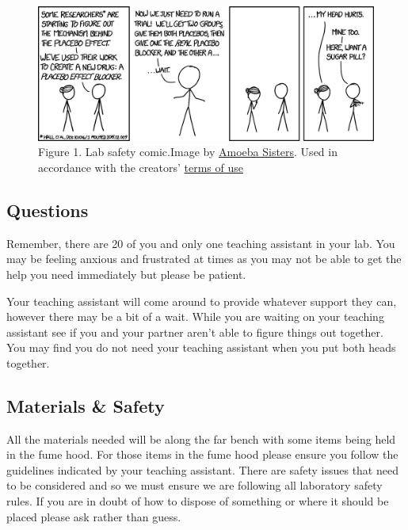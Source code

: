 \documentclass[
]{book}
\begin{document}
\begin{figure}
\centering
\includegraphics{figures_images/Lab4-Fig1.png}
\caption{Figure 1. Lab safety comic.Image by \href{Lab4-Fig1.png}{Amoeba Sisters}. Used in accordance with the creators' \href{https://www.amoebasisters.com/termsofuse.html}{terms of use}}
\end{figure}

\hypertarget{questions}{%
\subsection*{Questions}\label{questions}}

Remember, there are 20 of you and only one teaching assistant in your lab. You may be feeling anxious and frustrated at times as you may not be able to get the help you need immediately but please be patient.

Your teaching assistant will come around to provide whatever support they can, however there may be a bit of a wait. While you are waiting on your teaching assistant see if you and your partner aren't able to figure things out together. You may find you do not need your teaching assistant when you put both heads together.

\hypertarget{materials-safety}{%
\subsection*{Materials \& Safety}\label{materials-safety}}

All the materials needed will be along the far bench with some items being held in the fume hood. For those items in the fume hood please ensure you follow the guidelines indicated by your teaching assistant. There are safety issues that need to be considered and so we must ensure we are following all laboratory safety rules. If you are in doubt of how to dispose of something or where it should be placed please ask rather than guess.
\end{document}
